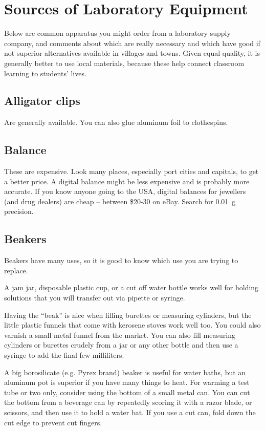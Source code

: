 \chapter{Sources of Laboratory Equipment}
\label{cha:labequip}
Below are common apparatus you might order from a laboratory supply company, 
and comments about which are really necessary 
and which have good if not superior alternatives 
available in villages and towns. 
Given equal quality, 
it is generally better to use local materials, 
because these help connect classroom learning to students' lives.

\section{Alligator clips}
Are generally available. 
You can also glue aluminum foil to clothespins.

\section{Balance}
These are expensive. 
Look many places, 
especially port cities and capitals, 
to get a better price. 
A digital balance might be less expensive 
and is probably more accurate. 
If you know anyone going to the USA, 
digital balances for jewellers (and drug dealers) are cheap -- %
between \$20-30 on eBay. 
Search for 0.01~g precision.

\section{Beakers}
Beakers have many uses, 
so it is good to know which use you are trying to replace.

A jam jar, 
disposable plastic cup, 
or a cut off water bottle works well for holding solutions 
that you will transfer out via pipette or syringe.

Having the ``beak'' is nice when filling burettes or measuring cylinders, 
but the little plastic funnels that come with kerosene stoves work well too. 
You could also varnish a small metal funnel from the market. 
You can also fill measuring cylinders or burettes crudely 
from a jar or any other bottle 
and then use a syringe to add the final few milliliters.

A big borosilicate (e.g. 
Pyrex brand) beaker is useful for water baths, 
but an aluminum pot is superior if you have many things to heat. 
For warming a test tube or two only, 
consider using the bottom of a small metal can. 
You can cut the bottom from a beverage can 
by repeatedly scoring it with a razor blade, 
or scissors, 
and then use it to hold a water bat. 
If you use a cut can, 
fold down the cut edge to prevent cut fingers.

